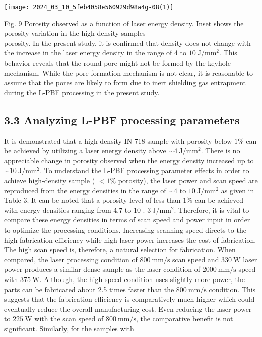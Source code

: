 \documentclass[10pt]{article}
\begin{document}
\begin{center}
\texttt{[image: 2024\_03\_10\_5feb4058e560929d98a4g-08(1)]}
\end{center}

Fig. 9 Porosity observed as a function of laser energy density. Inset shows the porosity variation in the high-density samples\\
porosity. In the present study, it is confirmed that density does not change with the increase in the laser energy density in the range of 4 to $10 \mathrm{~J} / \mathrm{mm}^{2}$. This behavior reveals that the round pore might not be formed by the keyhole mechanism. While the pore formation mechanism is not clear, it is reasonable to assume that the pores are likely to form due to inert shielding gas entrapment during the L-PBF processing in the present study.

\subsection*{3.3 Analyzing L-PBF processing parameters}
It is demonstrated that a high-density IN 718 sample with porosity below $1 \%$ can be achieved by utilizing a laser energy density above $\sim 4 \mathrm{~J} / \mathrm{mm}^{2}$. There is no appreciable change in porosity observed when the energy density increased up to $\sim 10 \mathrm{~J} / \mathrm{mm}^{2}$. To understand the L-PBF processing parameter effects in order to achieve high-density sample ( $<1 \%$ porosity), the laser power and scan speed are reproduced from the energy densities in the range of $\sim 4$ to $10 \mathrm{~J} / \mathrm{mm}^{2}$ as given in Table 3. It can be noted that a porosity level of less than $1 \%$ can be achieved with energy densities ranging from 4.7 to 10 . $3 \mathrm{~J} / \mathrm{mm}^{2}$. Therefore, it is vital to compare these energy densities in terms of scan speed and power input in order to optimize the processing conditions. Increasing scanning speed directs to the high fabrication efficiency while high laser power increases the cost of fabrication. The high scan speed is, therefore, a natural selection for fabrication. When compared, the laser processing condition of $800 \mathrm{~mm} / \mathrm{s}$ scan speed and $330 \mathrm{~W}$ laser power produces a similar dense sample as the laser condition of $2000 \mathrm{~mm} / \mathrm{s}$ speed with $375 \mathrm{~W}$. Although, the high-speed condition uses slightly more power, the parts can be fabricated about 2.5 times faster than the $800 \mathrm{~mm} / \mathrm{s}$ condition. This suggests that the fabrication efficiency is comparatively much higher which could eventually reduce the overall manufacturing cost. Even reducing the laser power to $225 \mathrm{~W}$ with the scan speed of $800 \mathrm{~mm} / \mathrm{s}$, the comparative benefit is not significant. Similarly, for the samples with
\end{document}
